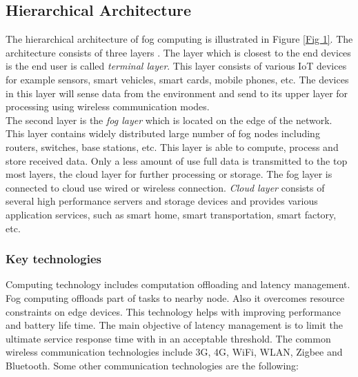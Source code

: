\documentclass[10pt,a4paper,journal]{IEEEtran}
\begin{document}
\subsection{Hierarchical Architecture}
\hspace*{1em}	The hierarchical architecture of fog computing is illustrated in Figure \ref{Fig 1}. The architecture consists of three layers \cite{2}. The layer which is closest to the end devices is the end user is called \textit{terminal layer}. This layer consists of various IoT devices for example sensors, smart vehicles, smart cards, mobile phones, etc. The devices in this layer will sense data from the environment and send to its upper layer for processing using wireless communication modes.\\
\hspace*{1em}	The second layer is the \textit{fog layer} which is located on the edge of the network. This layer contains widely distributed large number of fog nodes including routers, switches, base stations, etc. This layer is able to compute, process and store received data. Only a less amount of use full data is transmitted to the top most layers, the cloud layer for further processing or storage. The fog layer is connected to cloud use wired or wireless connection. \textit{Cloud layer} consists of several high performance servers and storage devices and provides various application services, such as smart home, smart transportation, smart factory, etc.

\subsubsection{Key technologies}
	Computing technology includes computation offloading and latency management. Fog computing offloads part of tasks to nearby node. Also it overcomes resource constraints on edge devices. This technology helps with improving performance and battery life time. The main objective of latency management is to limit the ultimate service response time with in an acceptable threshold.
	The common wireless communication technologies include 3G, 4G, WiFi, WLAN, Zigbee and Bluetooth. Some other communication technologies are the following: 
\end{document}
